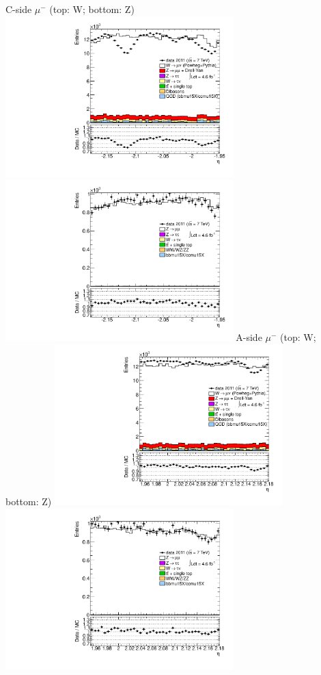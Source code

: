  {
\colb[T]
C-side $\mu^{-}$ (top: W; bottom: Z)
\centering
\includegraphics[width=0.66\textwidth]{dates/20130306/figures/both/W_10_C_stack_l_eta_POS} \\
\includegraphics[width=0.66\textwidth]{dates/20130306/figures/both/Z_10_C_stack_lP_eta_ALL.pdf}
A-side $\mu^{-}$ (top: W; bottom: Z)
\centering
\includegraphics[width=0.66\textwidth]{dates/20130306/figures/both/W_10_A_stack_l_eta_POS} \\
\includegraphics[width=0.66\textwidth]{dates/20130306/figures/both/Z_10_A_stack_lP_eta_ALL.pdf} 
\cole
}
